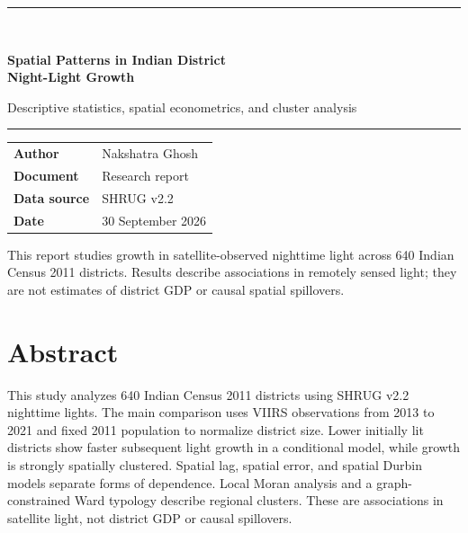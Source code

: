 \documentclass[11pt]{article}
\begin{document}
\hypersetup{pageanchor=false}
\begin{titlepage}
  \thispagestyle{empty}
  \vspace*{18mm}

  {\color{reportblue}\rule{\textwidth}{2.2pt}}\\[12mm]
  {\fontsize{27}{32}\selectfont\bfseries\color{reportblue}
    Spatial Patterns in Indian District\\[2mm]
    Night-Light Growth\par}
  \vspace{7mm}
  {\Large\color{reportgray}
    Descriptive statistics, spatial econometrics, and cluster analysis\par}
  \vspace{11mm}
  {\color{rulegray}\rule{\textwidth}{0.8pt}}

  \vfill

  \begin{tabular}{@{}ll@{}}
    \textbf{Author} & Nakshatra Ghosh \\
    \textbf{Document} & Research report \\
    \textbf{Data source} & SHRUG v2.2 \\
    \textbf{Date} & 30 September 2026
  \end{tabular}

  \vfill

  \begin{minipage}{0.92\textwidth}
    \small\color{reportgray}
    This report studies growth in satellite-observed nighttime light across
    640 Indian Census 2011 districts. Results describe associations in
    remotely sensed light; they are not estimates of district GDP or causal
    spatial spillovers.
  \end{minipage}
  \vspace{10mm}
\end{titlepage}

\hypersetup{pageanchor=true}

\section*{Abstract}

This study analyzes 640 Indian Census 2011 districts using SHRUG v2.2
nighttime lights. The main comparison uses VIIRS observations from 2013 to
2021 and fixed 2011 population to normalize district size. Lower initially lit
districts show faster subsequent light growth in a conditional model, while
growth is strongly spatially clustered. Spatial lag, spatial error, and
spatial Durbin models separate forms of dependence. Local Moran analysis and
a graph-constrained Ward typology describe regional clusters. These are
associations in satellite light, not district GDP or causal spillovers.
\end{document}
